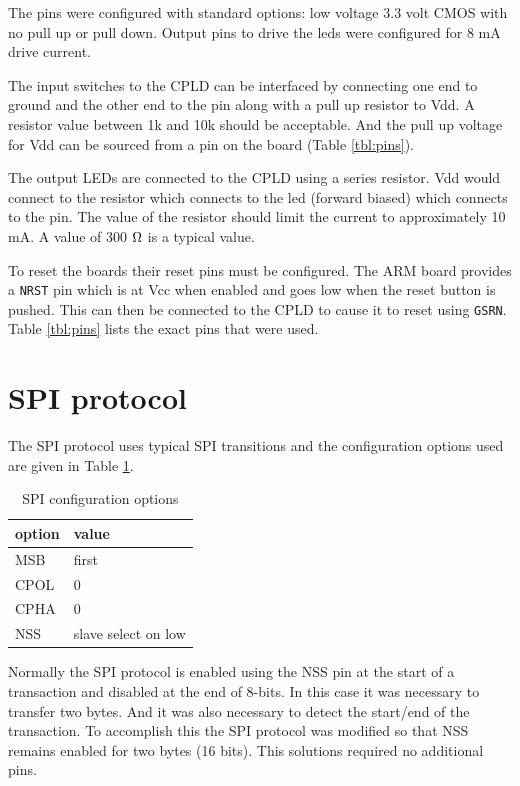 \documentclass{article}
\begin{document}
The pins were configured with standard options:
low voltage 3.3 volt CMOS with no pull up or pull down.
Output pins to drive the leds were configured for 8 mA drive current.

The input switches to the CPLD can be interfaced by connecting
one end to ground and the other end to the pin along with a
pull up resistor to Vdd.
A resistor value between 1k and 10k should be acceptable.
And the pull up voltage for Vdd can be sourced from a pin on
the board (Table \ref{tbl:pins}).

The output LEDs are connected to the CPLD using a series
resistor.
Vdd would connect to the resistor which connects to the led
(forward biased) which connects to the pin.
The value of the resistor should limit the current to approximately
10 mA.
A value of 300 $\ohm$ is a typical value.

To reset the boards their reset pins must be configured.
The ARM board provides a \verb+NRST+ pin which is at Vcc
when enabled and goes low when the reset button is pushed\cite[Pg. 17, 20]{UM1079}.
This can then be connected to the CPLD to cause
it to reset using \verb+GSRN+\citetext{\citealp[Pg. 13, 46, 50, 53]{DS1002}; \citealp[Pg. 8]{EB66}}.
Table \ref{tbl:pins} lists the exact pins that were used.


\section{SPI protocol}

The SPI protocol uses typical SPI transitions
\citetext{ \citealp[Pg. 278]{cady2009microcontrollers}; \citealp[Pg. 665]{STRM0038}}
and the configuration options used are given in Table \ref{tbl:spi}.

\begin{table}
\center
\begin{tabular}{|l|l|}
	\hline
	option & value \\
	\hline
	MSB & first \\
	CPOL & 0 \\
	CPHA & 0 \\
	NSS & slave select on low \\
	\hline
\end{tabular}
\caption{SPI configuration options}
\label{tbl:spi}
\end{table}

Normally the SPI protocol is enabled using the NSS pin at the
start of a transaction and disabled at the end of 8-bits.
In this case it was necessary to transfer two bytes.
And it was also necessary to detect the start/end of the transaction.
To accomplish this the SPI protocol was modified so that NSS
remains enabled for two bytes (16 bits).
This solutions required no additional pins.
\end{document}

